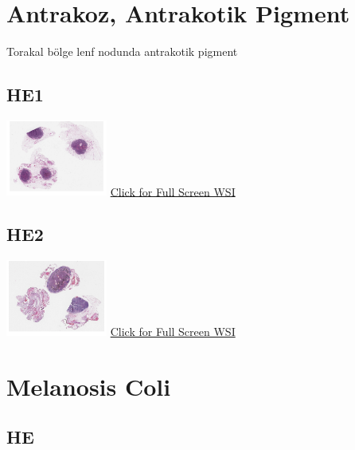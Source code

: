 \documentclass[
  letterpaper,
  DIV=11,
  numbers=noendperiod]{scrreprt}
\begin{document}
\hypertarget{sec-antrakoz-antrakotik-pigment}{%
\section{Antrakoz, Antrakotik
Pigment}\label{sec-antrakoz-antrakotik-pigment}}

Torakal bölge lenf nodunda antrakotik pigment

\hypertarget{he1}{%
\subsection{HE1}\label{he1}}

\href{https://images.patolojiatlasi.com/anthracosis/HE.html}{\includegraphics[width=0.25\textwidth,height=\textheight]{./screenshots/thumbnail_anthracosis1.png}}
\href{https://images.patolojiatlasi.com/anthracosis/HE.html}{Click for
Full Screen WSI}

\hypertarget{he2}{%
\subsection{HE2}\label{he2}}

\href{https://images.patolojiatlasi.com/anthracosis/HE2.html}{\includegraphics[width=0.25\textwidth,height=\textheight]{./screenshots/thumbnail_anthracosis2.png}}
\href{https://images.patolojiatlasi.com/anthracosis/HE2.html}{Click for
Full Screen WSI}

\hypertarget{sec-melanosis-coli}{%
\section{Melanosis Coli}\label{sec-melanosis-coli}}

\hypertarget{he-1}{%
\subsection{HE}\label{he-1}}
\end{document}
